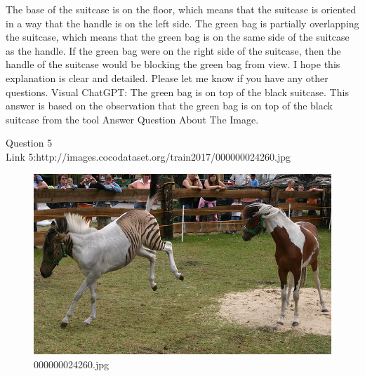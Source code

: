 \begin{enumerate}
        The base of the suitcase is on the floor, which means that the suitcase is oriented in a way that the handle is on the left side.
        The green bag is partially overlapping the suitcase, which means that the green bag is on the same side of the suitcase as the handle.
        If the green bag were on the right side of the suitcase, then the handle of the suitcase would be blocking the green bag from view.
        I hope this explanation is clear and detailed. Please let me know if you have any other questions.
        \subitem Visual ChatGPT: The green bag is on top of the black suitcase. This answer is based on the observation that the green bag is on top of the black suitcase from the tool Answer Question About The Image.
    \end{enumerate}
Question 5\\
Link 5:http://images.cocodataset.org/train2017/000000024260.jpg
    \begin{figure}[h]
        \centering
        \includegraphics[width=0.8\linewidth]{../image set/easy/000000024260.jpg}
        \caption{000000024260.jpg}
    \end{figure}
